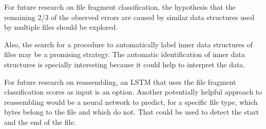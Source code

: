 For future research on file fragment classification, the hypothesis that the remaining 2/3 of the observed errors are caused by similar data structures used by multiple files should be explored.

Also, the search for a procedure to automatically label inner data structures of files may be a promising strategy. The automatic identification of inner data structures is specially interesting because it could help to interpret the data.

For future research on reassembling, an LSTM that uses the file fragment classification scores as input is an option. Another potentially helpful approach to reassembling would be a neural network to predict, for a specific file type, which bytes belong to the file and which do not. That could be used to detect the start and the end of the file.












